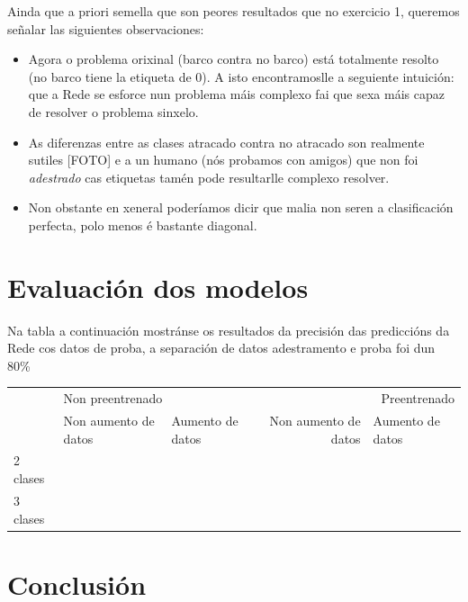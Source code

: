 \documentclass{article}
\begin{document}
Ainda que a priori semella que son peores resultados que no exercicio 1, queremos señalar las siguientes observaciones:

\begin{itemize}
	\item Agora o problema orixinal (barco contra no barco) está totalmente resolto (no barco tiene la etiqueta de 0). A isto encontramoslle a seguiente intuición: que a Rede se esforce nun problema máis complexo fai que sexa máis capaz de resolver o problema sinxelo.
	\item As diferenzas entre as clases atracado contra no atracado son realmente sutiles [FOTO] e a un humano (nós probamos con amigos) que non foi \emph{adestrado} cas etiquetas tamén pode resultarlle complexo resolver. 
	\item Non obstante en xeneral poderíamos dicir que malia non seren a clasificación perfecta, polo  menos é bastante diagonal.
\end{itemize}

\section{Evaluación dos modelos}

Na tabla a continuación mostránse os resultados da precisión das prediccións da Rede cos datos de proba, a separación de datos adestramento e proba foi dun 80\%

\begin{table}[h]
\begin{tabular}{l|ll|rl|}
\cline{2-5}
                               & \multicolumn{2}{l|}{Non preentrenado}                        & \multicolumn{2}{r|}{Preentrenado}                            \\ \cline{2-5} 
                               & \multicolumn{1}{l|}{Non aumento de datos} & Aumento de datos & \multicolumn{1}{r|}{Non aumento de datos} & Aumento de datos \\ \hline
\multicolumn{1}{|l|}{2 clases} & \multicolumn{1}{l|}{}                     &                  & \multicolumn{1}{r|}{}                     &                  \\ \hline
\multicolumn{1}{|l|}{3 clases} & \multicolumn{1}{l|}{}                     &                  & \multicolumn{1}{r|}{}                     &                  \\ \hline
\end{tabular}
\end{table}


\section{Conclusión}
\end{document}
